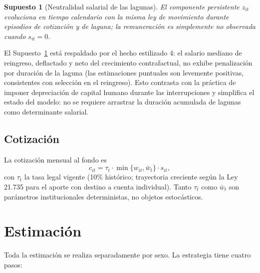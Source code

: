 \documentclass[11pt]{article}
\newtheorem{assumption}{Supuesto}
\begin{document}
\begin{assumption}[Neutralidad salarial de las lagunas]
\label{as:noscar}
El componente persistente $z_{it}$ evoluciona en tiempo calendario con la
misma ley de movimiento durante episodios de cotización y de laguna; la
remuneración es simplemente no observada cuando $s_{it}=0$.
\end{assumption}

El Supuesto~\ref{as:noscar} está respaldado por el hecho estilizado 4: el
salario mediano de reingreso, deflactado y neto del crecimiento contrafactual,
no exhibe penalización por duración de la laguna (las estimaciones puntuales
son levemente positivas, consistentes con selección en el reingreso). Esto
contrasta con la práctica de imponer depreciación de capital humano durante
las interrupciones y simplifica el estado del modelo: no se requiere
arrastrar la duración acumulada de lagunas como determinante salarial.

\subsection{Cotización}

La cotización mensual al fondo es
\begin{equation}
c_{it} = \tau_t \cdot \min\{w_{it}, \bar w_t\} \cdot s_{it},
\end{equation}
con $\tau_t$ la tasa legal vigente (10\% histórico; trayectoria creciente
según la Ley 21.735 para el aporte con destino a cuenta individual). Tanto
$\tau_t$ como $\bar w_t$ son parámetros institucionales deterministas, no
objetos estocásticos.

\section{Estimación}
\label{sec:estimacion}

Toda la estimación se realiza separadamente por sexo. La estrategia tiene
cuatro pasos:
\end{document}
